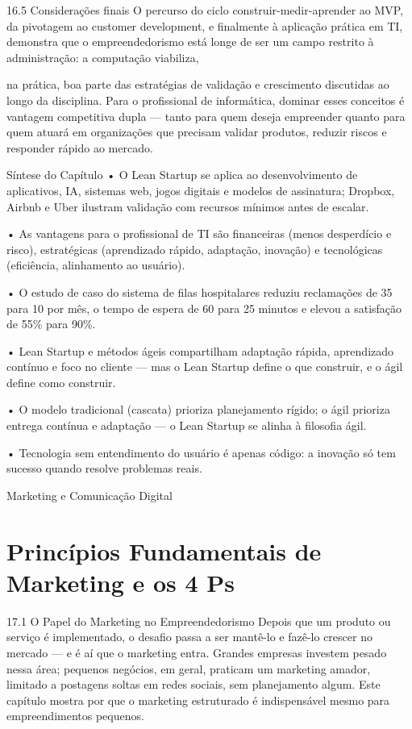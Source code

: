 16.5 Considerações finais O percurso do ciclo construir-medir-aprender ao MVP, da pivotagem ao customer development, e finalmente à aplicação prática em TI, demonstra que o empreendedorismo está longe de ser um campo restrito à administração: a computação viabiliza,

na prática, boa parte das estratégias de validação e crescimento discutidas ao longo da disciplina. Para o profissional de informática, dominar esses conceitos é vantagem competitiva dupla — tanto para quem deseja empreender quanto para quem atuará em organizações que precisam validar produtos, reduzir riscos e responder rápido ao mercado.

Síntese do Capítulo • O Lean Startup se aplica ao desenvolvimento de aplicativos, IA, sistemas web, jogos digitais e modelos de assinatura; Dropbox, Airbnb e Uber ilustram validação com recursos mínimos antes de escalar.

• As vantagens para o profissional de TI são financeiras (menos desperdício e risco), estratégicas (aprendizado rápido, adaptação, inovação) e tecnológicas (eficiência, alinhamento ao usuário).

• O estudo de caso do sistema de filas hospitalares reduziu reclamações de 35 para 10 por mês, o tempo de espera de 60 para 25 minutos e elevou a satisfação de 55\% para 90\%.

• Lean Startup e métodos ágeis compartilham adaptação rápida, aprendizado contínuo e foco no cliente — mas o Lean Startup define o que construir, e o ágil define como construir.

• O modelo tradicional (cascata) prioriza planejamento rígido; o ágil prioriza entrega contínua e adaptação — o Lean Startup se alinha à filosofia ágil.

• Tecnologia sem entendimento do usuário é apenas código: a inovação só tem sucesso quando resolve problemas reais.

Marketing e Comunicação Digital

\chapter{Princípios Fundamentais de Marketing e os 4 Ps}

17.1 O Papel do Marketing no Empreendedorismo Depois que um produto ou serviço é implementado, o desafio passa a ser mantê-lo e fazê-lo crescer no mercado — e é aí que o marketing entra. Grandes empresas investem pesado nessa área; pequenos negócios, em geral, praticam um marketing amador, limitado a postagens soltas em redes sociais, sem planejamento algum. Este capítulo mostra por que o marketing estruturado é indispensável mesmo para empreendimentos pequenos.

